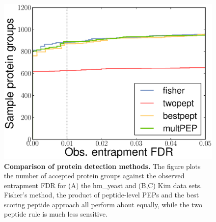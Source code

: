 \documentclass{article}
\begin{document}

\begin{figure}
  \centering
  \includegraphics[width=0.45\linewidth]{./img/unique-pept-performance}
  \caption{{\bf Comparison of protein detection methods.}  The figure
    plots the number of accepted protein groups against the observed
    entrapment FDR for (A) the hm\_yeast and (B,C) Kim data
    sets. Fisher's method, the product of peptide-level PEPs and the
    best scoring peptide approach all perform about equally, while the
    two peptide rule is much less sensitive.}

  \label{fig:power}
\end{figure}
\end{document}
